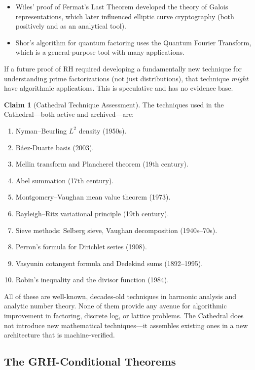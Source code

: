 \documentclass[11pt,a4paper]{article}
\theoremstyle{definition}
\newtheorem{claim}[theorem]{Claim}
\theoremstyle{plain}
\begin{document}
\begin{itemize}
  \item Wiles' proof of Fermat's Last Theorem developed the theory of
    Galois representations, which later influenced elliptic curve
    cryptography (both positively and as an analytical tool).
  \item Shor's algorithm for quantum factoring uses the Quantum Fourier
    Transform, which is a general-purpose tool with many applications.
\end{itemize}

If a future proof of RH required developing a fundamentally new
technique for understanding prime factorizations (not just
distributions), that technique \emph{might} have algorithmic
applications. This is speculative and has no evidence base.

\begin{claim}[Cathedral Technique Assessment]
The techniques used in the Cathedral---both active and archived---are:
\begin{enumerate}
  \item Nyman--Beurling $L^2$ density (1950s).
  \item B\'aez-Duarte basis (2003).
  \item Mellin transform and Plancherel theorem (19th century).
  \item Abel summation (17th century).
  \item Montgomery--Vaughan mean value theorem (1973).
  \item Rayleigh--Ritz variational principle (19th century).
  \item Sieve methods: Selberg sieve, Vaughan decomposition (1940s--70s).
  \item Perron's formula for Dirichlet series (1908).
  \item Vasyunin cotangent formula and Dedekind sums (1892--1995).
  \item Robin's inequality and the divisor function (1984).
\end{enumerate}
All of these are well-known, decades-old techniques in harmonic
analysis and analytic number theory. None of them provide any
avenue for algorithmic improvement in factoring, discrete log,
or lattice problems. The Cathedral does not introduce new
mathematical techniques---it assembles existing ones in a new
architecture that is machine-verified.
\end{claim}

\subsection{The GRH-Conditional Theorems}
\end{document}
